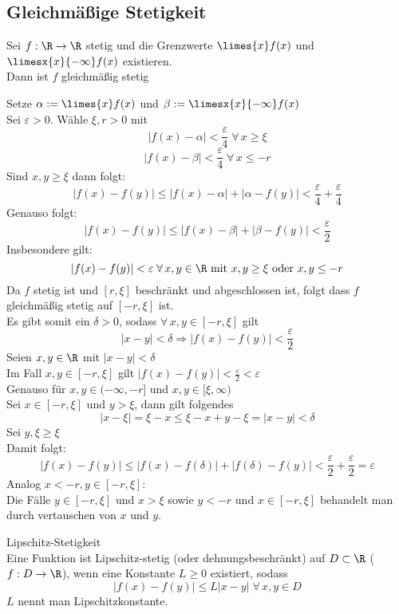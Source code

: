 \documentclass[../ana1u.tex]{subfiles}
\begin{document}
\subsection{Gleichmäßige Stetigkeit}
\begin{beh}
    Sei \(f:\R \rightarrow \R \) stetig und die Grenzwerte \(\limes{x} f(x)\) und 
    \(\limesx{x}{-\infty} f(x) \) existieren. \\
    Dann ist \(f\) gleichmäßig stetig
\end{beh}
\begin{bew}
    Setze \(\alpha := \limes{x} f(x) \) und \(\beta := \limesx{x}{-\infty} f(x) \) \\
    Sei \(\varepsilon > 0 \). Wähle \(\xi, r > 0 \) mit
    \[|f(x) - \alpha| < \frac{\varepsilon}{4} \; \forall \, x \geq \xi \]
    \[|f(x) - \beta| < \frac{\varepsilon}{4} \; \forall \, x \leq -r \]
    Sind \(x,y \geq \xi \) dann folgt:
    \[|f(x)-f(y)| \leq |f(x) - \alpha| + |\alpha - f(y)| < \frac{\varepsilon}{4} + \frac{\varepsilon}{4} \]
    Genauso folgt:
    \[|f(x)-f(y)| \leq |f(x)-\beta| + |\beta-f(y)| < \frac{\varepsilon}{2} \]
    Insbesondere gilt:
    \[|f(x)-f(y)| < \varepsilon \; \forall \, x,y \in \R \text{ mit } x,y \geq \xi \text{ oder } x,y \leq -r \]
    Da \(f\) stetig ist und \([r, \xi] \) beschränkt und abgeschlossen ist, folgt dass \(f\) gleichmäßig
    stetig auf \([-r,\xi] \) ist. \\
    Es gibt somit ein \(\delta > 0 \), sodass \(\forall \, x,y \in [-r, \xi] \) gilt
    \[|x-y| < \delta \Rightarrow |f(x)-f(y)| < \frac{\varepsilon}{2} \]
    Seien \(x,y \in \R \) mit \(|x-y| < \delta \) \\
    Im Fall \(x,y \in [-r, \xi] \) gilt \(|f(x)-f(y)| < \frac{\varepsilon}{2} < \varepsilon \) \\
    Genauso für \(x,y \in (-\infty, -r] \) und \(x,y \in [\xi, \infty) \) \\
    Sei \(x \in [-r, \xi] \) und \(y > \xi \), dann gilt folgendes 
    \[|x-\xi| = \xi - x \leq \xi - x+y - \xi = |x-y| < \delta \]
    Sei \(y, \xi \geq \xi \) \\
    Damit folgt:
    \[|f(x)-f(y)| \leq |f(x)-f(\delta)| + |f(\delta)-f(y)| < \frac{\varepsilon}{2} + \frac{\varepsilon}{2}
    = \varepsilon \]
    Analog \(x < -r, y \in [-r,\xi] \): \\
    Die Fälle \(y \in [-r, \xi] \) und \(x > \xi \) sowie \(y < -r \) und \(x \in [-r, \xi] \) behandelt
    man durch vertauschen von \(x \) und \(y \).
\end{bew}
\begin{defi*}
    Lipschitz-Stetigkeit \\
    Eine Funktion ist Lipschitz-stetig (oder dehnungsbeschränkt) auf \(D \subset \R \) (\(f:D \rightarrow \R \)),
    wenn eine Konstante \(L \geq 0 \) existiert, sodass
    \[|f(x)-f(y)| \leq L|x-y| \; \forall \, x,y \in D \]
    \(L \) nennt man Lipschitzkonstante.
\end{defi*}
\end{document}
